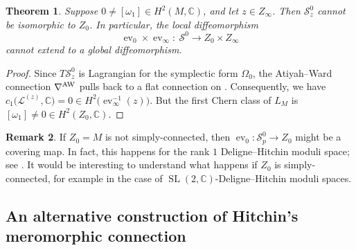 \documentclass[pdftex]{sigma}
\numberwithin{equation}{section}
\newtheorem{Theorem}{Theorem}[section]
\theoremstyle{definition}
\newtheorem{Remark}[Theorem]{Remark}
\newcommand\C{{\mathbb C}}
\begin{document}
\begin{Theorem}\label{Thm:S0neqZ0Zinfty}
Suppose $0 \neq [\omega_1] \in H^2(M, {\mathbb C})$, and let $z \in Z_\infty$.
Then $\mathcal{S}^0_z$ cannot be isomorphic to $Z_0$.
In particular, the local diffeomorphism
\[
\operatorname{ev}_0\times\operatorname{ev}_\infty
 \colon\ \mathcal S^0 \longrightarrow Z_0\times Z_\infty
\]
cannot extend to a global diffeomorphism.
\end{Theorem}

\begin{proof}
Since $T\mathcal S_z^0$ is Lagrangian for the symplectic form $\Omega_0$, the Atiyah--Ward
connection $\nabla^{\rm AW}$ pulls back to a flat connection on . Consequently, we have $c_1\bigl(\mathcal{L}^{(z)}, {\mathbb C}\bigr)
 = 0 \in H^2\bigl(\operatorname{ev}_{\infty}^{-1}(z)\bigr)$.
But the first Chern class of $L_M$ is $[\omega_1] \neq 0 \in H^2(Z_0, {\mathbb C})$.
\end{proof}

\begin{Remark}
If $Z_{0} = M$ is not simply-connected,
then $\operatorname{ev}_0 \colon \mathcal S^0_p \longrightarrow Z_0$ might be a covering map.
In fact, this happens for the rank $1$ Deligne--Hitchin moduli space; see \cite{BH}.
It would be interesting to understand what happens if
 $Z_{0}$ is simply-connected, for example in the case of $\operatorname{SL}(2,\C)$-Deligne--Hitchin moduli spaces.
\end{Remark}

\subsection{An alternative construction of Hitchin's meromorphic connection}\label{subsec:alternativeconn}
\end{document}
